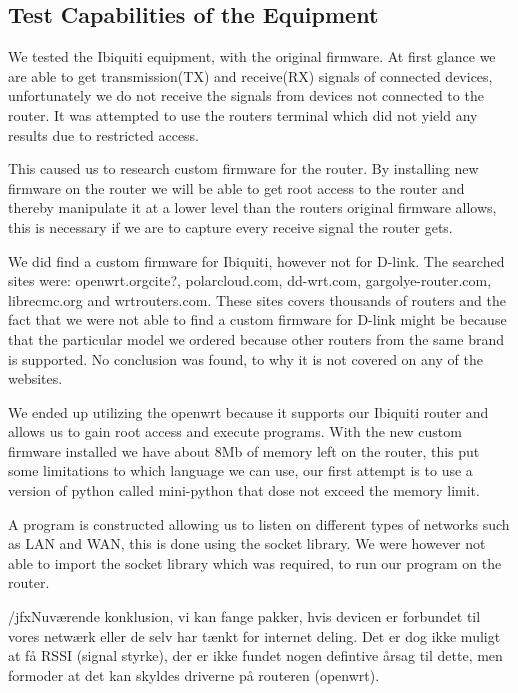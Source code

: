 \subsection*{Test Capabilities of the Equipment}
We tested the Ibiquiti equipment, with the original firmware. At first glance we are able to get transmission(TX) and receive(RX) signals of connected devices, unfortunately we do not receive the signals from devices not connected to the router. It was attempted to use the routers terminal which did not yield any results due to restricted access.

This caused us to research custom firmware for the router. By installing new firmware on the router we will be able to get root access to the router and thereby manipulate it at a lower level than the routers original firmware allows, this is necessary if we are to capture every receive signal the router gets.

We did find a custom firmware for Ibiquiti, however not for D-link. The searched sites were: openwrt.org{cite?}, polarcloud.com, dd-wrt.com, gargolye-router.com, librecmc.org and wrtrouters.com. These sites covers thousands of routers and the fact that we were not able to find a custom firmware for D-link might be because that the particular model we ordered because other routers from the same brand is supported. No conclusion was found, to why it is not covered on any of the websites.

We ended up utilizing the openwrt because it supports our Ibiquiti router and allows us to gain root access and execute programs. With the new custom firmware installed we have about 8Mb of memory left on the router, this put some limitations to which language we can use, our first attempt is to use a version of python called mini-python that dose not exceed the memory limit.

A program is constructed allowing us to listen on different types of networks such as LAN and WAN, this is done using the socket library. We were however not able to import the socket library which was required, to run our program on the router.

/jfx{Nuværende konklusion, vi kan fange pakker, hvis devicen er forbundet til vores netwærk eller de selv har tænkt for internet deling. Det er dog ikke muligt at få RSSI (signal styrke), der er ikke fundet nogen defintive årsag til dette, men formoder at det kan skyldes driverne på routeren (openwrt).}